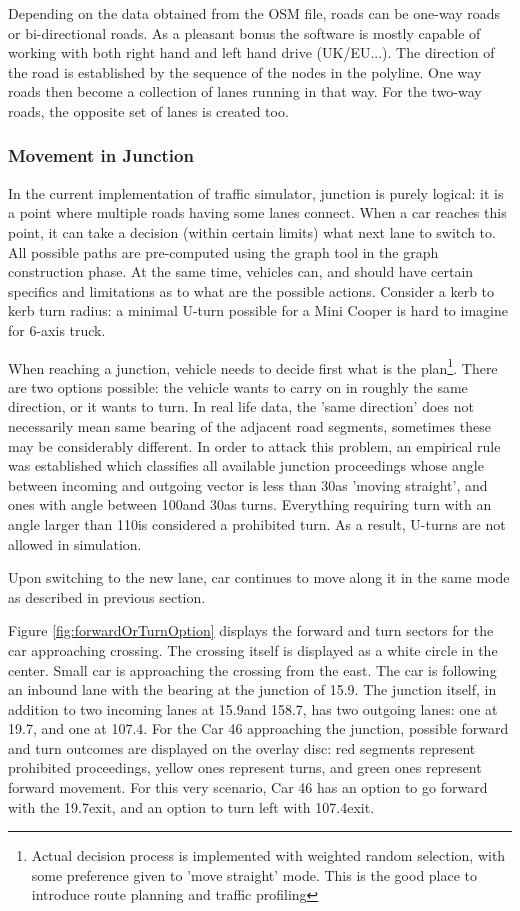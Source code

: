 Depending on the data obtained from the OSM file, roads can be one-way roads or bi-directional roads. As a pleasant bonus the software is mostly capable of working with both right hand and left hand drive (UK/EU...). The direction of the road is established by the sequence of the nodes in the polyline. One way roads then become a collection of lanes running in that way. For the two-way roads, the opposite set of lanes is created too.

\subsubsection{Movement in Junction}
In the current implementation of traffic simulator, junction is purely logical: it is a point where multiple roads having some lanes connect. When a car reaches this point, it can take a decision (within certain limits) what next lane to switch to. All possible paths are pre-computed using the graph tool in the graph construction phase. At the same time, vehicles can, and should have certain specifics and limitations as to what are the possible actions. Consider a kerb to kerb turn radius: a minimal U-turn possible for a Mini Cooper is hard to imagine for 6-axis truck.

When reaching a junction, vehicle needs to decide first what is the plan\footnote{Actual decision process is implemented with weighted random selection, with some preference given to 'move straight' mode. This is the good place to introduce route planning and traffic profiling}. There are two options possible: the vehicle wants to carry on in roughly the same direction, or it wants to turn. In real life data, the 'same direction' does not necessarily mean same bearing of the adjacent road segments, sometimes these may be considerably different. In order to attack this problem, an empirical rule was established which classifies all available junction proceedings whose angle between incoming and outgoing vector is less than 30\degspc  as 'moving straight', and ones with angle between 100\degspc  and 30\degspc as turns. Everything requiring turn with an angle larger than 110\degspc is considered a prohibited turn. As a result, U-turns are not allowed in simulation.

Upon switching to the new lane, car continues to move along it in the same mode as described in previous section.

Figure \ref{fig:forwardOrTurnOption} displays the forward and turn sectors for the car approaching crossing. The crossing itself is displayed as a white circle in the center. Small car is approaching the crossing from the east. The car is following an inbound lane with the bearing at the junction of 15.9\degspc. The junction itself, in addition to two incoming lanes at 15.9\degspc and 158.7\degspc, has two outgoing lanes: one at 19.7\degspc, and one at 107.4\degspc. For the Car 46 approaching the junction, possible forward and turn outcomes are displayed on the overlay disc: red segments represent prohibited proceedings, yellow ones represent turns, and green ones represent forward movement. For this very scenario, Car 46 has an option to go forward with the 19.7\degspc exit, and an option to turn left with 107.4\degspc exit.

